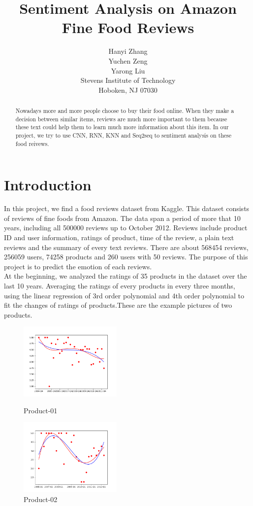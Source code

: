\documentclass{article}
\title{Sentiment Analysis on Amazon Fine Food Reviews}
\author{%
  Hanyi Zhang\\
  Yuchen Zeng\\
  Yarong Liu\\
  Stevens Institute of Technology\\
  Hoboken, NJ 07030 \\
}
\begin{document}

\maketitle
\begin{abstract}
Nowadays more and more people choose to buy their food online. When they make a decision between similar items, reviews are much more important to them because these text could help them to learn much more information about this item. In our project, we try to use CNN, RNN, KNN and Seq2seq to sentiment analysis on these food reivews.
\end{abstract}
\section{Introduction}
In this project, we find a food reviews dataset from Kaggle. This dataset consists of reviews of fine foods from Amazon. The data span a period of more that 10 years, including all 500000 reviews up to October 2012. Reviews include product ID and user information, ratings of product, time of the review, a plain text reviews and the summary of every text reviews. There are about 568454 reviews, 256059 users, 74258 products and 260 users with 50 reviews. The purpose of this project is to predict the emotion of each reviews.\\[2]
At the beginning, we analyzed the ratings of 35 products in the dataset over the last 10 years. Averaging the ratings of every products in every three months, using the linear regression of 3rd order polynomial and 4th order polynomial to fit the changes of ratings of products.These are the example pictures of two products.

\begin{figure}[htbp]
\centering
\begin{minipage}[t]{0.48\textwidth}
\centering
\includegraphics[width=5cm]{Intro-01.png}
\caption{Product-01}
\end{minipage}
\begin{minipage}[t]{0.48\textwidth}
\centering
\includegraphics[width=5cm]{Intro-02.png}
\caption{Product-02}
\end{minipage}
\end{figure}
\end{document}
